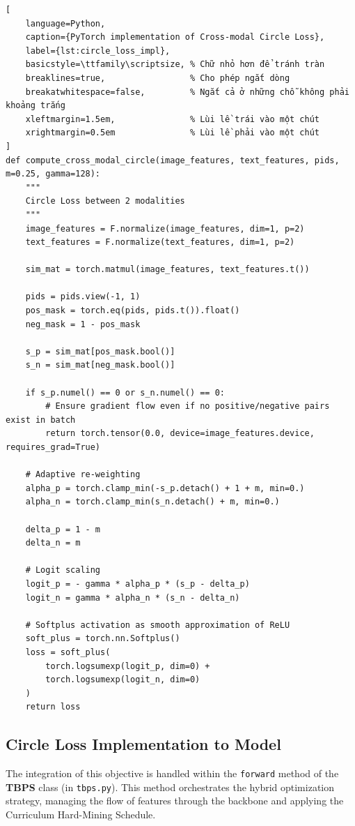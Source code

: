 \documentclass[../main.tex]{subfiles}
\begin{document}
\begin{lstlisting}[
    language=Python, 
    caption={PyTorch implementation of Cross-modal Circle Loss},
    label={lst:circle_loss_impl},
    basicstyle=\ttfamily\scriptsize, % Chữ nhỏ hơn để tránh tràn
    breaklines=true,                 % Cho phép ngắt dòng
    breakatwhitespace=false,         % Ngắt cả ở những chỗ không phải khoảng trắng
    xleftmargin=1.5em,               % Lùi lề trái vào một chút
    xrightmargin=0.5em               % Lùi lề phải vào một chút
]
def compute_cross_modal_circle(image_features, text_features, pids, m=0.25, gamma=128):
    """
    Circle Loss between 2 modalities
    """
    image_features = F.normalize(image_features, dim=1, p=2)
    text_features = F.normalize(text_features, dim=1, p=2)

    sim_mat = torch.matmul(image_features, text_features.t())

    pids = pids.view(-1, 1)
    pos_mask = torch.eq(pids, pids.t()).float()
    neg_mask = 1 - pos_mask

    s_p = sim_mat[pos_mask.bool()]
    s_n = sim_mat[neg_mask.bool()]

    if s_p.numel() == 0 or s_n.numel() == 0:
        # Ensure gradient flow even if no positive/negative pairs exist in batch
        return torch.tensor(0.0, device=image_features.device, requires_grad=True)

    # Adaptive re-weighting
    alpha_p = torch.clamp_min(-s_p.detach() + 1 + m, min=0.)
    alpha_n = torch.clamp_min(s_n.detach() + m, min=0.)

    delta_p = 1 - m
    delta_n = m

    # Logit scaling
    logit_p = - gamma * alpha_p * (s_p - delta_p)
    logit_n = gamma * alpha_n * (s_n - delta_n)

    # Softplus activation as smooth approximation of ReLU
    soft_plus = torch.nn.Softplus()
    loss = soft_plus(
        torch.logsumexp(logit_p, dim=0) +
        torch.logsumexp(logit_n, dim=0)
    )
    return loss
\end{lstlisting}

\subsection{Circle Loss Implementation to Model}
The integration of this objective is handled within the \texttt{forward} method of the \textbf{TBPS} class (in \texttt{tbps.py}). This method orchestrates the hybrid optimization strategy, managing the flow of features through the backbone and applying the Curriculum Hard-Mining Schedule.
\end{document}
